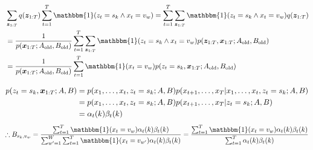 \documentclass[aspectratio=169,unicode,dvipdfmx,14pt]{beamer}
\begin{document}
\begin{frame}
\FontMath
\begin{align}
& \sum_{\bm{z}_{1:T}} q(\bm{z}_{1:T}) \sum_{t=1}^T 
\mathbbm{1}( z_t = s_k \wedge x_t = v_w )
= \sum_{t=1}^T \sum_{\bm{z}_{1:T}}   
\mathbbm{1}( z_t = s_k \wedge x_t = v_w ) q(\bm{z}_{1:T})
\notag \\ &
= 
\frac{1}{p(\bm{x}_{1:T}; A_{\mbox{\scriptsize old}}, B_{\mbox{\scriptsize old}})}
\sum_{t=1}^T \sum_{\bm{z}_{1:T}}  
\mathbbm{1}( z_t = s_k \wedge x_t = v_w )
p(\bm{z}_{1:T} , \bm{x}_{1:T}; A_{\mbox{\scriptsize old}}, B_{\mbox{\scriptsize old}})
\notag \\ &
= 
\frac{1}{p(\bm{x}_{1:T}; A_{\mbox{\scriptsize old}}, B_{\mbox{\scriptsize old}})}
\sum_{t=1}^T \mathbbm{1}( x_t = v_w )
p(z_t = s_k, \bm{x}_{1:T}; A_{\mbox{\scriptsize old}}, B_{\mbox{\scriptsize old}})
\end{align}

\begin{align}
p(z_t = s_k, \bm{x}_{1:T}; A, B)
& = 
p(x_1, \ldots, x_t, z_t = s_k; A, B)
p(x_{t+1}, \ldots, x_T | x_1, \ldots, x_t, z_t = s_k; A, B)
\notag \\ & = 
p(x_1, \ldots, x_t, z_t = s_k; A, B)
p(x_{t+1}, \ldots, x_T | z_t = s_k; A, B)
\notag \\ & = 
\alpha_t(k) \beta_t(k)
\end{align}
\begin{align}
\therefore B_{s_k, v_w} 
= 
\frac{ \sum_{t=1}^T  \mathbbm{1}( x_t = v_w ) \alpha_t(k) \beta_t(k) }{ \sum_{w^\prime=1}^W \sum_{t=1}^T  \mathbbm{1}( x_t = v_{w^\prime} ) \alpha_t(k) \beta_t(k) }
= 
\frac{ \sum_{t=1}^T  \mathbbm{1}( x_t = v_w ) \alpha_t(k) \beta_t(k) }
{ \sum_{t=1}^T \alpha_t(k) \beta_t(k) }
\end{align}
\end{frame}
\end{document}

